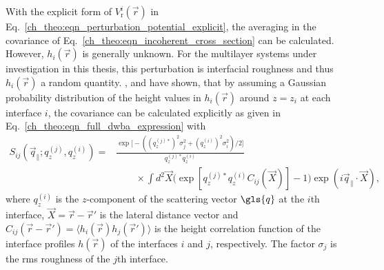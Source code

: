 With the explicit form of $V^i_\text{r}(\vec{r})$ in Eq.~\eqref{ch_theo:eqn_perturbation_potential_explicit}, the averaging in the covariance of Eq.~\eqref{ch_theo:eqn_incoherent_cross_section} can be calculated. However, $h_i(\vec{r})$ is generally unknown. For the multilayer systems under investigation in this thesis, this perturbation is interfacial roughness and thus $h_i(\vec{r})$ a random quantity. \textcite{sinha_x-ray_1988}, \textcite{de_boer_x-ray_1995} and \textcite{mikulik_x-ray_1997} have shown, that by assuming a Gaussian probability distribution of the height values in $h_i(\vec{r})$ around $z=z_i$ at each interface $i$, the covariance can be calculated explicitly as given in Eq.~\eqref{ch_theo:eqn_full_dwba_expression} with
\begin{align}
S_{ij}(\vec{q}_\parallel; q_z^{(j)}, q_z^{(i)}) = &\frac{\exp \Big[-((q_z^{(j)*})^{2} \sigma_j^2 + (q_z^{(i)})^{2} \sigma_i^2)/2\Big]}{q_z^{(j)*} q_z^{(i)}}  \nonumber \\
&\qquad \times \int d^2 \vec{X} \Big(\exp [q_z^{(j)*} q_z^{(i)} C_{ij}(\vec{X})]-1\Big) \exp(i \vec{q}_\parallel \cdot \vec{X}) \text{,} \label{ch_theo:eqn_full_dwba_roughness_factor}
\end{align}
where $q_z^{(i)}$ is the $z$-component of the scattering vector $\gls{q}$ at the $i$th interface, $\vec{X} = \vec{r} - \vec{r}'$ is the lateral distance vector and $C_{ij}(\vec{r}-\vec{r}') = \langle h_i(\vec{r}) h_j(\vec{r}') \rangle$ is the height correlation function of the interface profiles $h(\vec{r})$ of the interfaces $i$ and $j$, respectively. The factor $\sigma_j$ is the \gls{rms} roughness of the $j$th interface.


